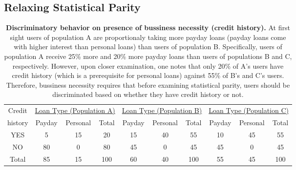 \subsection{Relaxing Statistical Parity}
\label{sect:relaxedstatparity}
\begin{table*}[t]
{ \small
  \center
  \renewcommand{\arraystretch}{1.5}
  \begin{tabular}{ c | c c c | c c c | c c c}
    Credit
    & \multicolumn{3}{|c|}{\underline{Loan Type (Population A)}}
    & \multicolumn{3}{|c}{\underline{Loan Type (Population B) }}
    & \multicolumn{3}{|c}{\underline{Loan Type (Population C) }} \\
    history & Payday & Personal & Total & Payday & Personal & Total & Payday & Personal & Total \\
    \hline
    YES & 5  & 15 & 20 & 15 & 40 & 55 & 10 & 45 & 55 \\
    NO  & 80 & 0  & 80 & 45 & 0 & 45 & 45 & 0 & 45\\
    \hline
    Total & 85 & 15 & 100 & 60 & 40 & 100 & 55 & 45 & 100\\
  \end{tabular}
  \caption{{\bf Discriminatory behavior on presence of bussiness necessity (credit history).}
    At first sight users of population A are proportionaly taking more payday loans
    (payday loans come with higher interest than personal loans) than users of population B.
    Specifically, users of population A receive 25\% more and 20\% more  payday loans than
    users of populations B and C, respectively. However, upon closer examination, one notes
    that only 20\% of A's users have credit history (which is a prerequisite for personal
    loans) against 55\% of B's and C's users. Therefore, bussiness necessity requires that
    before examining statistical parity, users should be discriminated based on whether
    they have credit history or not.
  }
  \label{tab:BusinessNessecityA}
}
\end{table*}

